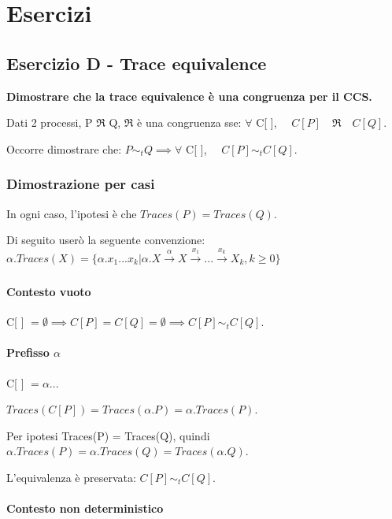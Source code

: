 \newpage
\section{Esercizi}

\subsection{Esercizio D - Trace equivalence}

\textbf{Dimostrare che la trace equivalence è una congruenza per il CCS.}

Dati 2 processi, P $\Re$ Q, $\Re$ è una congruenza sse: $\forall$ C[ ], $\quad C[P] \quad \Re \quad C[Q].$

Occorre dimostrare che: $P \sim_t Q \implies \forall$ C[ ], $\quad C[P] \sim_t C[Q]$.

\subsubsection{Dimostrazione per casi}

In ogni caso, l'ipotesi è che $Traces(P) = Traces(Q)$.

Di seguito userò la seguente convenzione: $\alpha.Traces(X) = \{ \alpha.x_1...x_k | \alpha.X \xrightarrow[]{\alpha} X \xrightarrow[]{x_1} ... \xrightarrow[]{x_k} X_k, k \geq 0\}$

\paragraph{Contesto vuoto}

C[ ] $= \emptyset \implies C[P] = C[Q] = \emptyset \implies C[P] \sim_t C[Q]$.

\paragraph{Prefisso $\alpha$}

C[ ] $= \alpha ...$

$Traces(C[P]) = Traces(\alpha.P) = \alpha.Traces(P)$.

Per ipotesi Traces(P) = Traces(Q), quindi $\alpha.Traces(P) = \alpha.Traces(Q) = Traces(\alpha.Q)$.

L'equivalenza è preservata: $C[P] \sim_t C[Q]$.

\paragraph{Contesto non deterministico}

